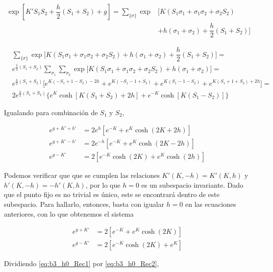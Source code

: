 \documentclass[10pt]{article}
\begin{document}
\begin{align*}
\exp \left[ K' S_1 S_2 + \dfrac{h}{2}\left( S_1 + S_2\right) +g \right] = \sum_{\lbrace \sigma \rbrace} \exp &\bigg[ K(S_1 \sigma_1 + \sigma_1 \sigma_2 + \sigma_2 S_2) \\
&+ h (\sigma_1 + \sigma_2) + \dfrac{h}{2} (S_1 + S_2) \bigg]
\end{align*}

\begin{align*}
&\sum_{\lbrace \sigma \rbrace} \exp \bigg[ K(S_1 \sigma_1 + \sigma_1 \sigma_2 + \sigma_2 S_2) + h (\sigma_1 + \sigma_2) + \dfrac{h}{2} (S_1 + S_2) \bigg] = \\
&e^{\frac{h}{2} (S_1 + S_2)} \sum_{\sigma_1} \sum_{\sigma_2} \exp \bigg[ K(S_1 \sigma_1 + \sigma_1 \sigma_2 + \sigma_2 S_2) + h (\sigma_1 + \sigma_2) \bigg] = \\
&e^{\frac{h}{2} (S_1 + S_2)} \bigg[ e^{K(-S_1 + 1 - S_2) - 2h} + e^{K(-S_1 - 1 +S_2)} + e^{K(S_1 - 1 - S_2)} + e^{K(S_1 + 1 + S_2) + 2h} \bigg] = \\
&2 e^{\frac{h}{2} (S_1 + S_2)}\bigg\lbrace e^{K} \cosh\left[ K(S_1+S_2)+2h \right] + e^{-K} \cosh\left[ K(S_1-S_2) \right] \bigg\rbrace 
\end{align*}

Igualando para combinaci\'on de $S_1$ y $S_2$,

\begin{align}
e^{g+K'+h'} &= 2e^{h}\left[e^{-K} + e^K\cosh(2K+2h) \right] \label{eq:b3_Rec1}\\
e^{g+K'-h'} &= 2e^{-h}\left[e^{-K} + e^K\cosh(2K-2h) \right]\label{eq:b3_Rec2} \\
e^{g-K'} &= 2\left[ e^{-K} \cosh(2K) + e^K \cosh(2h) \right] \label{eq:b3_Rec3}
\end{align}
 
Podemos verificar que que se cumplen las relaciones $K'(K, -h) = K'(K, h)$ y $h'(K, -h) = -h'(K, h)$, por lo que $h=0$ es un subespacio invariante. Dado que el punto fijo es no trivial es \'unico, este se encontrar\'a dentro de este subespacio. Para hallarlo, entonces, basta con igualar $h = 0$ en las ecuaciones anteriores, con lo que obtenemos el sistema


\begin{align}
e^{g+K'} &= 2\left[e^{-K} + e^K \cosh(2K) \right] \label{eq:b3_h0_Rec1} \\
e^{g-K'} &= 2\left[e^{-K}\cosh(2K) + e^K \right] \label{eq:b3_h0_Rec2}
\end{align}

Dividiendo  \ref{eq:b3_h0_Rec1} por  \ref{eq:b3_h0_Rec2},
\end{document}
